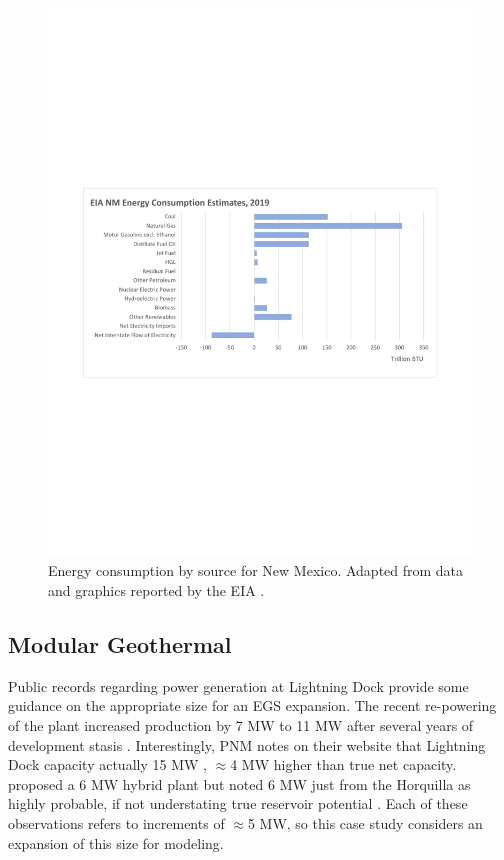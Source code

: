 \begin{figure}[!htp]
\centering
\includegraphics[width=\textwidth]{templates/images/Figure-EIA_NM_Energy_Consumption.pdf}
\caption[NM energy consumption]{Energy consumption by source for New Mexico. Adapted from data and graphics reported by the EIA \protect\citep{eia_new_2021}.}
\label{fig:nm_energy_consumption}
\end{figure}

\subsection{Modular Geothermal}

Public records regarding power generation at Lightning Dock provide some guidance on the appropriate size for an EGS expansion. The recent re-powering of the plant increased production by 7 MW to 11 MW after several years of development stasis \citep{think_geoenergy_turboden_2020}. Interestingly, PNM notes on their website that Lightning Dock capacity actually 15 MW \citep{pnm_geothermal_2021}, $\approx$4 MW higher than true net capacity. \citeauthor{schochet_development_2001} proposed a 6 MW hybrid plant but noted 6 MW just from the Horquilla as highly probable, if not understating true reservoir potential \citeyear{schochet_development_2001}. Each of these observations refers to increments of $\approx$5 MW, so this case study considers an expansion of this size for modeling.

